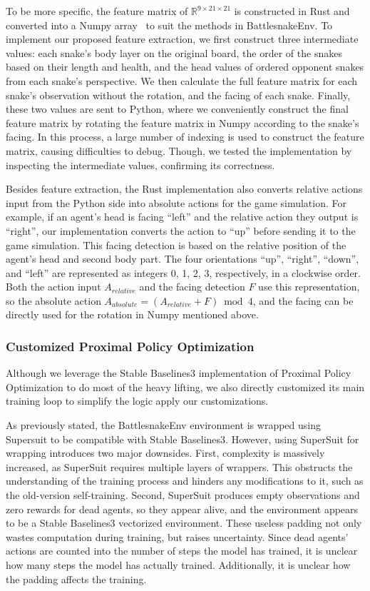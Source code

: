 \documentclass[conference]{IEEEtran}
\begin{document}
To be more specific,
the feature matrix of $\mathbb R^{9\times21\times21}$ is constructed in Rust and
converted into a Numpy array~\cite{harris2020array}
to suit the methods in \textsf{BattlesnakeEnv}.
To implement our proposed feature extraction,
we first construct three intermediate values:
each snake's body layer on the original board,
the order of the snakes based on their length and health,
and the head values of ordered opponent snakes from each snake's perspective.
We then calculate the full feature matrix for each snake's observation without
the rotation, and the facing of each snake. Finally,
these two values are sent to Python,
where we conveniently construct the final feature matrix by rotating the feature
matrix in Numpy according to the snake's facing. In this process,
a large number of indexing is used to construct the feature matrix,
causing difficulties to debug. Though,
we tested the implementation by inspecting the intermediate values,
confirming its correctness.

Besides feature extraction,
the Rust implementation also converts relative actions input from the Python
side into absolute actions for the game simulation. For example,
if an agent's head is facing ``left'' and the relative action they output is
``right'',
our implementation converts the action to ``up'' before sending it to the game
simulation.
This facing detection is based on the relative position of the agent's head and
second body part. The four orientations ``up'', ``right'', ``down'',
and ``left'' are represented as integers 0, 1, 2, 3, respectively,
in a clockwise order.
Both the action input $A_{relative}$ and the facing detection $F$ use this
representation, so the absolute action $A_{absolute}=(A_{relative}+F)\bmod 4$,
and the facing can be directly used for the rotation in Numpy mentioned above.

\subsubsection{Customized Proximal Policy Optimization}

Although we leverage the Stable Baselines3 implementation of Proximal Policy
Optimization to do most of the heavy lifting,
we also directly customized its main training loop to simplify the logic
apply our customizations.

As previously stated, the \textsf{BattlesnakeEnv} environment is wrapped using
Supersuit to be compatible with Stable Baselines3.
However, using SuperSuit for wrapping introduces two major downsides. First,
complexity is massively increased,
as SuperSuit requires multiple layers of wrappers.
This obstructs the understanding of the training process and hinders any
modifications to it, such as the old-version self-training. Second,
SuperSuit produces empty observations and zero rewards for dead agents,
so they appear alive,
and the environment appears to be a Stable Baselines3 vectorized environment.
These useless padding not only wastes computation during training,
but raises uncertainty.
Since dead agents' actions are counted into the number of steps the model has
trained, it is unclear how many steps the model has actually trained.
Additionally, it is unclear how the padding affects the training.
\end{document}
